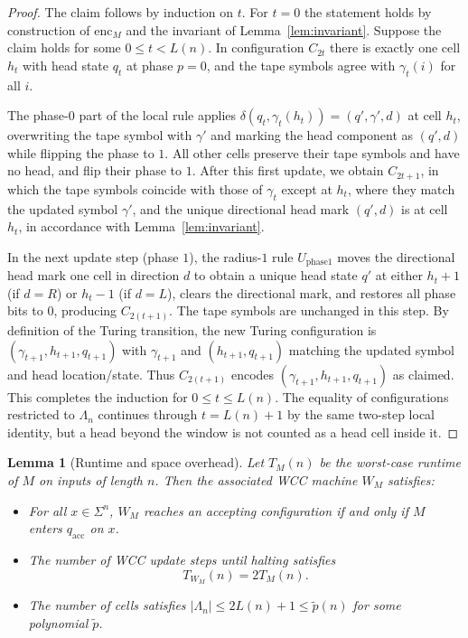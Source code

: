 \documentclass[12pt]{article}
\newtheorem{lemma}[theorem]{Lemma}
\begin{document}
\begin{proof}
The claim follows by induction on $t$. For $t=0$ the statement holds by
construction of $\mathrm{enc}_M$ and the invariant of Lemma~\ref{lem:invariant}.
Suppose the claim holds for some $0\le t<L(n)$. In configuration $C_{2t}$ there is
exactly one cell $h_t$ with head state $q_t$ at phase $p=0$, and the tape
symbols agree with $\gamma_t(i)$ for all $i$.

The phase-$0$ part of the local rule applies $\delta(q_t,\gamma_t(h_t)) =
(q',\gamma',d)$ at cell $h_t$, overwriting the tape symbol with $\gamma'$ and
marking the head component as $(q',d)$ while flipping the phase to $1$. All
other cells preserve their tape symbols and have no head, and flip their phase
to $1$. After this first update, we obtain $C_{2t+1}$, in which the tape symbols
coincide with those of $\gamma_t$ except at $h_t$, where they match the updated
symbol $\gamma'$, and the unique directional head mark $(q',d)$ is at cell
$h_t$, in accordance with Lemma~\ref{lem:invariant}.

In the next update step (phase $1$), the radius-$1$ rule $U_{\mathrm{phase1}}$
moves the directional head mark one cell in direction $d$ to obtain a unique
head state $q'$ at either $h_t+1$ (if $d=R$) or $h_t-1$ (if $d=L$), clears the
directional mark, and restores all phase bits to $0$, producing $C_{2(t+1)}$.
The tape symbols are unchanged in this step. By definition of the Turing
transition, the new Turing configuration is $(\gamma_{t+1}, h_{t+1}, q_{t+1})$
with $\gamma_{t+1}$ and $(h_{t+1},q_{t+1})$ matching the updated symbol and
head location/state. Thus $C_{2(t+1)}$ encodes $(\gamma_{t+1}, h_{t+1},
q_{t+1})$ as claimed. This completes the induction for
$0\le t\le L(n)$. The equality of configurations restricted to
$\Lambda_n$ continues through $t=L(n)+1$ by the same two-step local
identity, but a head beyond the window is not counted as a head cell
inside it.
\end{proof}

\begin{lemma}[Runtime and space overhead]
\label{lem:runtime}
Let $T_M(n)$ be the worst-case runtime of $M$ on inputs of length $n$. Then the
associated WCC machine $W_M$ satisfies:
\begin{itemize}
  \item For all $x \in \Sigma^n$, $W_M$ reaches an accepting configuration if
    and only if $M$ enters $q_{\mathrm{acc}}$ on $x$.
  \item The number of WCC update steps until halting satisfies
    \[
    T_{W_M}(n) = 2 T_M(n).
    \]
  \item The number of cells satisfies $|\Lambda_n| \le 2L(n)+1 \le
    \tilde{p}(n)$ for some polynomial $\tilde{p}$.
\end{itemize}
\end{lemma}
\end{document}
